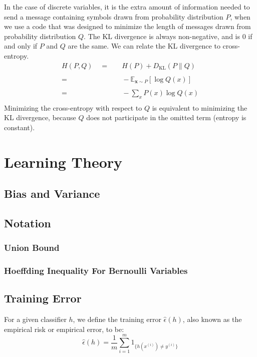 \documentclass[twoside,twocolumn]{article}
\begin{document}
In the case of discrete variables, it is the extra amount of information
needed to send a message containing symbols drawn from probability distribution
$P$, when we use a code that was designed to minimize the length of messages
drawn from probability distribution $Q$. The KL divergence is always
non-negative, and is $0$ if and only if $P$ and $Q$ are the same. We can
relate the KL divergence to cross-entropy.
\begin{equation}
  \begin{split}
    H(P, Q) \quad =& \quad H(P) + D _ { \mathrm { KL } } ( P \| Q ) \\
    \\
    =& \quad - \mathbb { E } _ { \mathbf { x } \sim P } \left[ \log Q ( x ) \right]\\
    \\
    =& \quad -\sum_x P(x) \log Q(x) \\
  \end{split}
\end{equation}
Minimizing the cross-entropy with respect to $Q$ is equivalent to
minimizing the KL divergence, because $Q$ does not participate in the
omitted term (entropy is constant).
\section{Learning Theory}
\subsection{Bias and Variance}
\subsection{Notation}
\subsubsection{Union Bound}
\subsubsection{Hoeffding Inequality For Bernoulli Variables}
\subsection{Training Error}
For a given classifier $h$, we define the training error $\widehat{\epsilon}(h)$,
also known as the empirical risk or empirical error, to be:
\begin{equation} \widehat{\epsilon}(h) = \frac{1}{m}\sum_{i=1}^m 1_{\{h(x^{(i)})\neq y^{(i)}\}} \end{equation}
\end{document}
